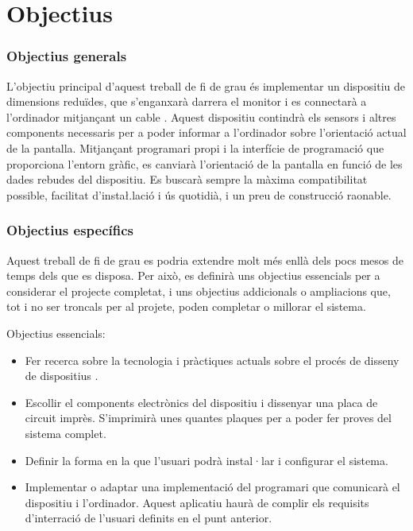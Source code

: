 \chapter{Objectius}
\label{cap:objectius}

\subsection{Objectius generals}

L'objectiu principal d'aquest treball de fi de grau és implementar un dispositiu
de dimensions reduïdes, que s'enganxarà darrera el monitor i es connectarà
a l'ordinador mitjançant un cable . Aquest dispositiu contindrà els
sensors i altres components necessaris per a poder informar a l'ordinador sobre
l'orientació actual de la pantalla. Mitjançant programari propi i la interfície
de programació que proporciona l'entorn gràfic, es canviarà l'orientació de la
pantalla en funció de les dades rebudes del dispositiu. Es buscarà sempre la
màxima compatibilitat possible, facilitat d'insta\l.lació i ús quotidià, i
un preu de construcció raonable.


\subsection{Objectius específics}

Aquest treball de fi de grau es podria extendre molt més enllà dels pocs mesos
de temps dels que es disposa. Per això, es definirà uns objectius essencials
per a considerar el projecte completat, i uns objectius addicionals o ampliacions
que, tot i no ser troncals per al projete, poden completar o millorar el
sistema.

Objectius essencials:
\begin{itemize}
    \item Fer recerca sobre la tecnologia i pràctiques actuals sobre el procés
    de disseny de dispositius .
    \item Escollir el components electrònics del dispositiu i dissenyar una
    placa de circuit imprès. S'imprimirà unes quantes plaques per a poder fer
    proves del sistema complet.
    \item Definir la forma en la que l'usuari podrà instal·lar i configurar
    el sistema.
    \item Implementar o adaptar una implementació del programari que comunicarà
    el dispositiu i l'ordinador. Aquest aplicatiu haurà de complir els
    requisits d'interració de l'usuari definits en el punt anterior.
\end{itemize}

